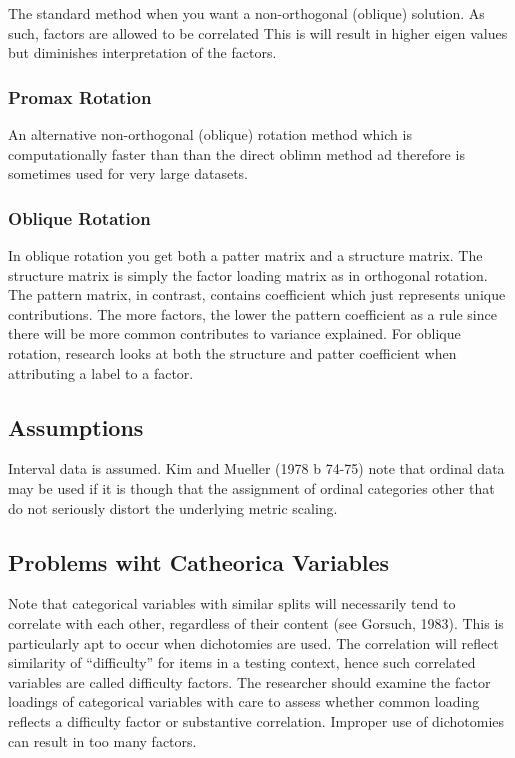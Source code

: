 \documentclass[]{book}
\theoremstyle{definition}
\theoremstyle{definition}
\theoremstyle{definition}
\theoremstyle{remark}
\begin{document}
The standard method when you want a non-orthogonal (oblique) solution.
As such, factors are allowed to be correlated This is will result in
higher eigen values but diminishes interpretation of the factors.

\subsubsection{Promax Rotation}\label{promax-rotation}

An alternative non-orthogonal (oblique) rotation method which is
computationally faster than than the direct oblimn method ad therefore
is sometimes used for very large datasets.

\subsubsection{Oblique Rotation}\label{oblique-rotation}

In oblique rotation you get both a patter matrix and a structure matrix.
The structure matrix is simply the factor loading matrix as in
orthogonal rotation. The pattern matrix, in contrast, contains
coefficient which just represents unique contributions. The more
factors, the lower the pattern coefficient as a rule since there will be
more common contributes to variance explained. For oblique rotation,
research looks at both the structure and patter coefficient when
attributing a label to a factor.

\subsection{Assumptions}\label{assumptions-1}

Interval data is assumed. Kim and Mueller (1978 b 74-75) note that
ordinal data may be used if it is though that the assignment of ordinal
categories other that do not seriously distort the underlying metric
scaling.

\subsection{Problems wiht Catheorica
Variables}\label{problems-wiht-catheorica-variables}

Note that categorical variables with similar splits will necessarily
tend to correlate with each other, regardless of their content (see
Gorsuch, 1983). This is particularly apt to occur when dichotomies are
used. The correlation will reflect similarity of ``difficulty'' for
items in a testing context, hence such correlated variables are called
difficulty factors. The researcher should examine the factor loadings of
categorical variables with care to assess whether common loading
reflects a difficulty factor or substantive correlation. Improper use of
dichotomies can result in too many factors.
\end{document}
